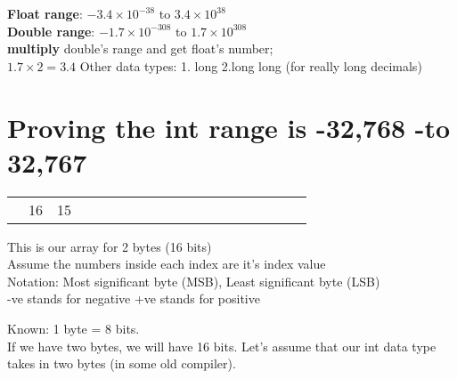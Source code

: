 \documentclass[a4paper,12pt]{book}
\begin{document}
\textbf{Float range}: $-3.4 \times 10^{-38}$ to $3.4 \times 10^{38}$ \\
\textbf{Double range}:  $-1.7 \times 10^{-308}$ to $1.7 \times 10^{308}$ \\
\textbf{multiply} double's range and get float's number;  \\
$1.7 \times 2 = 3.4$
Other data types: 1. long 2.long long (for really long decimals)


\section{Proving the int range is {-32,768 -to 32,767} } 
\begin{table}
\centering
\begin{tabular}{lllllllllllllllllll}
 &16  &15  &  &  &  &  &  &  &  &  &  &  &  &  &  &   
\end{tabular}
\end{table}

This is our array for 2 bytes (16 bits) \\
Assume the numbers inside each index are it's index value \\
Notation:
Most significant byte (MSB), Least significant byte (LSB) \\
-ve stands for negative
+ve stands for positive

Known: 1 byte = 8 bits. \\
If we have two bytes, we will have 16 bits. Let's assume that our int data type takes in two bytes (in some old compiler).
\end{document}
